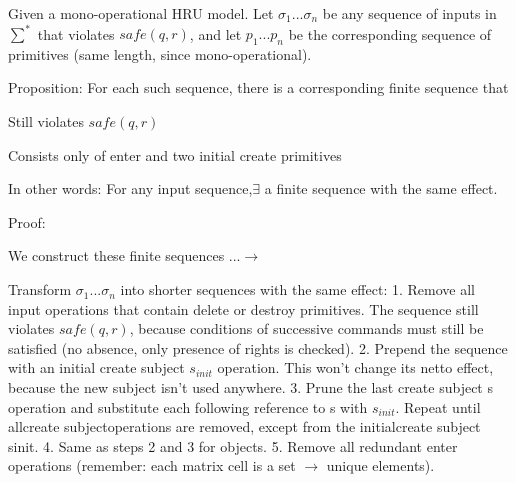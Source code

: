 \documentclass[a4paper]{article}
\begin{document}
\begin{multicols}{3}
    Given a mono-operational HRU model.
    Let $\sigma_1...\sigma_n$ be any sequence of inputs in $\sum^*$ that violates $safe(q,r)$, and let $p_1...p_n$ be the corresponding sequence of primitives (same length, since mono-operational).

    Proposition: For each such sequence, there is a corresponding finite sequence that
    \begin{itemize*}
        \item Still violates $safe(q,r)$
        \item Consists only of enter and two initial create primitives
    \end{itemize*}

    In other words: For any input sequence,$\exists$ a finite sequence with the same effect.

    Proof:
    \begin{itemize*}
        \item We construct these finite sequences ...$\rightarrow$
        \item Transform $\sigma_1...\sigma_n$ into shorter sequences with the same effect:
              1. Remove all input operations that contain delete or destroy primitives. The sequence still violates $safe(q,r)$, because conditions of successive commands must still be satisfied (no absence, only presence of rights is checked).
              2. Prepend the sequence with an initial create subject $s_{init}$ operation. This won’t change its netto effect, because the new subject isn’t used anywhere.
              3. Prune the last create subject s operation and substitute each following reference to s with $s_{init}$. Repeat until allcreate subjectoperations are removed, except from the initialcreate subject sinit.
              4. Same as steps 2 and 3 for objects.
              5. Remove all redundant enter operations (remember: each matrix cell is a set $\rightarrow$ unique elements).
    \end{itemize*}


\end{multicols}
\end{document}
